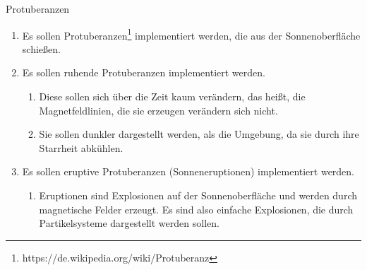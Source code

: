 \documentclass{article}
\begin{document}
\begin{enumerate}
    \vspace{0.5cm}

    {\bfseries\large\item Protuberanzen}
    \begin{enumerate}
      \item Es sollen
        Protuberanzen\footnote{https://de.wikipedia.org/wiki/Protuberanz}
        implementiert werden, die aus der Sonnenoberfläche schießen.
      \item Es sollen ruhende Protuberanzen implementiert werden.
      \begin{enumerate}
        \item Diese sollen sich über die Zeit kaum verändern, das heißt, die
          Magnetfeldlinien, die sie erzeugen verändern sich nicht.
        \item Sie sollen dunkler dargestellt werden, als die Umgebung, da sie
          durch ihre Starrheit abkühlen.
      \end{enumerate}
      \item Es sollen eruptive Protuberanzen (Sonneneruptionen) implementiert werden.
      \begin{enumerate}
        \item Eruptionen sind Explosionen auf der Sonnenoberfläche und werden
          durch magnetische Felder erzeugt. Es sind also einfache Explosionen, die
          durch Partikelsysteme dargestellt werden sollen.
      \end{enumerate}
    \end{enumerate}
  \end{enumerate}
\end{document}

